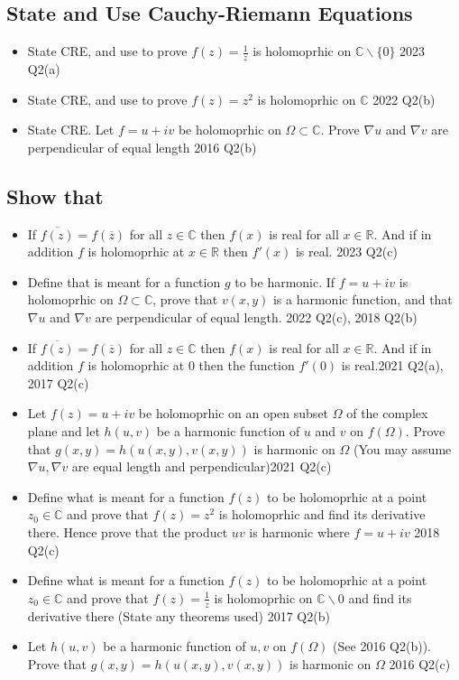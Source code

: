 \documentclass[a4paper, 8pt]{extarticle}
\begin{document}
\subsection{State and Use Cauchy-Riemann Equations}
\begin{itemize}
    \item State CRE, and use to prove $f(z) = \frac{1}{z}$ is holomoprhic on $\mathbb{C} \backslash \{0\}$ \hfill 2023 Q2(a)
    \item State CRE, and use to prove $f(z) = z^2$ is holomoprhic on $\mathbb{C}$ \hfill 2022 Q2(b)
    \item State CRE. Let $f = u+iv$ be holomoprhic on $\Omega \subset \mathbb{C}$. Prove $\nabla u$ and $\nabla v$ are perpendicular of equal length \hfill 2016 Q2(b)
\end{itemize}
\subsection{Show that}
\begin{itemize}
    \item If $\overline{f(z)} = f(\overline{z})$ for all $z \in \mathbb{C}$ then $f(x)$ is real for all $x \in \mathbb{R}$. And if in addition $f$ is holomoprhic at $x \in \mathbb{R}$ then $f'(x)$ is real. \hfill 2023 Q2(c)
    \item Define that is meant for a function $g$ to be harmonic. If $f = u +iv$ is holomoprhic on $\Omega \subset \mathbb{C}$, prove that $v(x,y)$ is a harmonic function, and that $\nabla u$ and $\nabla v$ are perpendicular of equal length. \hfill 2022 Q2(c), 2018 Q2(b)
    \item If $\overline{f(z)} = f(\overline{z})$ for all $z \in \mathbb{C}$ then $f(x)$ is real for all $x \in \mathbb{R}$. And if in addition $f$ is holomoprhic at $0$ then the function $f'(0)$ is real.\hfill 2021 Q2(a), 2017 Q2(c)
    \item Let $f(z) = u +iv$ be holomoprhic on an open subset $\Omega$ of the complex plane and let $h(u,v)$ be a harmonic function of $u$ and $v$ on $f(\Omega)$. Prove that $g(x,y) = h(u(x,y), v(x,y))$ is harmonic on $\Omega$ (You may assume $\nabla u, \nabla v$ are equal length and perpendicular)\hfill 2021 Q2(c)
    \item Define what is meant for a function $f(z)$ to be holomoprhic at a point $z_0 \in \mathbb{C}$ and prove that $f(z) = z^2$ is holomoprhic and find its derivative there. Hence prove that the product $uv$ is harmonic where $f=u +iv$ \hfill 2018 Q2(c)
    \item Define what is meant for a function $f(z)$ to be holomoprhic at a point $z_0 \in \mathbb{C}$ and prove that $f(z) = \frac{1}{z}$ is holomoprhic on $\mathbb{C} \backslash 0$ and find its derivative there (State any theorems used) \hfill 2017 Q2(b)
    \item Let $h(u,v)$ be a harmonic function of $u, v$ on $f(\Omega)$ (See 2016 Q2(b)). Prove that $g(x,y) = h(u(x,y), v(x,y))$ is harmonic on $\Omega$ \hfill 2016 Q2(c)
\end{itemize}
\end{document}
